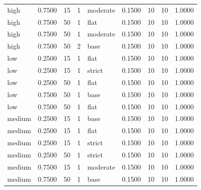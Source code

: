 \begin{tabular}{lrrrlrrrr}
high & 0.7500 & 15 & 1 & moderate & 0.1500 & 10 & 10 & 1.0000 \\
high & 0.7500 & 50 & 1 & flat & 0.1500 & 10 & 10 & 1.0000 \\
high & 0.7500 & 50 & 1 & moderate & 0.1500 & 10 & 10 & 1.0000 \\
high & 0.7500 & 50 & 2 & base & 0.1500 & 10 & 10 & 1.0000 \\
low & 0.2500 & 15 & 1 & flat & 0.1500 & 10 & 10 & 1.0000 \\
low & 0.2500 & 15 & 1 & strict & 0.1500 & 10 & 10 & 1.0000 \\
low & 0.2500 & 50 & 1 & flat & 0.1500 & 10 & 10 & 1.0000 \\
low & 0.7500 & 50 & 1 & base & 0.1500 & 10 & 10 & 1.0000 \\
low & 0.7500 & 50 & 1 & flat & 0.1500 & 10 & 10 & 1.0000 \\
medium & 0.2500 & 15 & 1 & base & 0.1500 & 10 & 10 & 1.0000 \\
medium & 0.2500 & 15 & 1 & flat & 0.1500 & 10 & 10 & 1.0000 \\
medium & 0.2500 & 15 & 1 & strict & 0.1500 & 10 & 10 & 1.0000 \\
medium & 0.2500 & 50 & 1 & strict & 0.1500 & 10 & 10 & 1.0000 \\
medium & 0.7500 & 15 & 1 & moderate & 0.1500 & 10 & 10 & 1.0000 \\
medium & 0.7500 & 50 & 1 & base & 0.1500 & 10 & 10 & 1.0000 \\
\bottomrule
\end{tabular}
